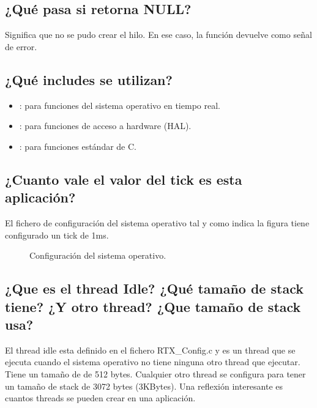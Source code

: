\documentclass[letterpaper,10pt,english]{sphinxmanual}
\begin{document}
\subsection{¿Qué pasa si  retorna NULL?}
\label{\detokenize{ejemplothreads:que-pasa-si-osthreadnew-retorna-null}}
\sphinxAtStartPar
Significa que no se pudo crear el hilo. En ese caso, la función  devuelve  como señal de error.


\subsection{¿Qué includes se utilizan?}
\label{\detokenize{ejemplothreads:que-includes-se-utilizan}}\begin{itemize}
\item {} 
\sphinxAtStartPar
{}: para funciones del sistema operativo en tiempo real.

\item {} 
\sphinxAtStartPar
{}: para funciones de acceso a hardware (HAL).

\item {} 
\sphinxAtStartPar
{}: para funciones estándar de C.

\end{itemize}


\subsection{¿Cuanto vale el valor del tick es esta aplicación?}
\label{\detokenize{ejemplothreads:cuanto-vale-el-valor-del-tick-es-esta-aplicacion}}
\sphinxAtStartPar
El fichero de configuración del sistema operativo tal y como indica la figura tiene configurado un tick de 1ms.

\begin{figure}[htbp]
\centering
\capstart

\noindent{}
\caption{Configuración del sistema operativo.}\label{\detokenize{ejemplothreads:id1}}\end{figure}


\subsection{¿Que es el thread Idle? ¿Qué tamaño de stack tiene? ¿Y otro thread? ¿Que tamaño de stack usa?}
\label{\detokenize{ejemplothreads:que-es-el-thread-idle-que-tamano-de-stack-tiene-y-otro-thread-que-tamano-de-stack-usa}}
\sphinxAtStartPar
El thread idle esta definido en el fichero RTX\_Config.c y es un thread que se ejecuta cuando el sistema operativo no tiene ninguna otro thread que ejecutar. Tiene un tamaño de  de 512 bytes.
Cualquier otro thread se configura para tener un tamaño de stack de 3072 bytes (3KBytes). Una reflexión interesante es cuantos threads se pueden crear en una aplicación.
\end{document}
